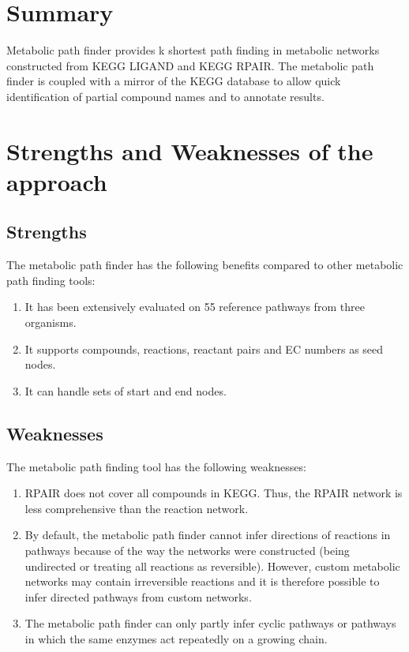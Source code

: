 \section{Summary}

Metabolic path finder provides k shortest path finding in metabolic networks constructed from KEGG LIGAND and KEGG RPAIR.
The metabolic path finder is coupled with a mirror of the KEGG database to allow quick identification of partial compound
names and to annotate results.

\section{Strengths and Weaknesses of the approach}

\subsection{Strengths}
The metabolic path finder has the following benefits compared to other metabolic path finding tools:
\begin{enumerate}

\item It has been extensively evaluated on 55 reference pathways from three organisms.

\item It supports compounds, reactions, reactant pairs and EC numbers as seed nodes.

\item It can handle sets of start and end nodes.

\end{enumerate}

\subsection{Weaknesses}
The metabolic path finding tool has the following weaknesses:

\begin{enumerate}

\item RPAIR does not cover all compounds in KEGG. Thus, the RPAIR network is less comprehensive than the reaction network.

\item By default, the metabolic path finder cannot infer directions of reactions in pathways because of
the way the networks were constructed (being undirected or treating all reactions as reversible).
However, custom metabolic networks may contain irreversible reactions and
it is therefore possible to infer directed pathways from custom networks.

\item The metabolic path finder can only partly infer cyclic pathways or pathways in which the same enzymes act repeatedly on a growing chain.

\end{enumerate}


